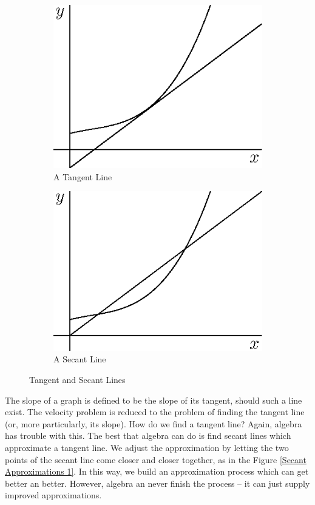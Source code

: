 \documentclass[fleqn]{report}
\begin{document}
\begin{figure}[ht]
\centering
\begin{subfigure}{.5\textwidth}
 \centering
 \includegraphics{figure11.eps}
 \caption{A Tangent Line}
\end{subfigure}%
\begin{subfigure}{.5\textwidth}
 \centering
 \includegraphics{figure12.eps}
 \caption{A Secant Line}
\end{subfigure}
\caption{Tangent and Secant Lines}
\label{Tangent and Secant Lines}
\end{figure}

The slope of a graph is defined to be the slope of its
tangent, should such a line exist. The velocity problem is
reduced to the problem of finding the tangent line (or, more
particularly, its slope). How do we find a tangent line?
Again, algebra has trouble with this.  The best that algebra
can do is find secant lines which approximate a tangent line.
We adjust the approximation by letting the two points of the
secant line come closer and closer together, as in the Figure
\ref{Secant Approximations 1}. In this way, we build an
approximation process which can get better an better. However,
algebra an never finish the process -- it can just supply
improved approximations.
\end{document}
